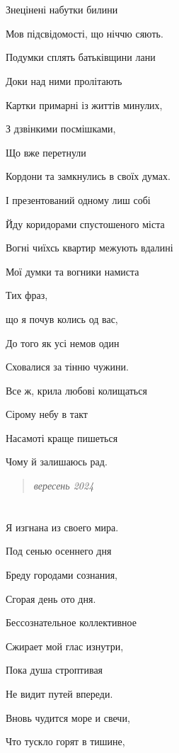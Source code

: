 \documentclass[
  a5paperpaper,
  DIV=11,
  numbers=noendperiod]{scrreprt}
\begin{document}
\section{}\label{section-21}

Знецінені набутки билини

Мов підсвідомості, що ніччю сяють.

Подумки сплять батьківщини лани

Доки над ними пролітають

Картки примарні із життів минулих,

З дзвінкими посмішками,

Що вже перетнули

Кордони та замкнулись в своїх думах.

І презентований одному лиш собі

Йду коридорами спустошеного міста

Вогні чиїхсь квартир межують вдалині

Мої думки та вогники намиста

Тих фраз,

що я почув колись од вас,

До того як усі немов один

Сховалися за тінню чужини.

Все ж, крила любові колищаться

Сірому небу в такт

Насамоті краще пишеться

Чому й залишаюсь рад.

\begin{quote}
\emph{вересень 2024}
\end{quote}

\section{}\label{section-22}

Я изгнана из своего мира.

Под сенью осеннего дня

Бреду городами сознания,

Сгорая день ото дня.

Бессознательное коллективное

Сжирает мой глас изнутри,

Пока душа строптивая

Не видит путей впереди.

Вновь чудится море и свечи,

Что тускло горят в тишине,
\end{document}
